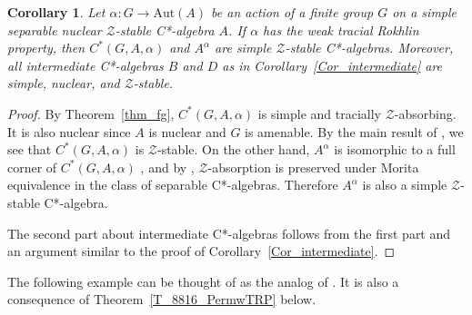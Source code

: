 \documentclass[11pt]{amsart}
\theoremstyle{plain}
\newtheorem{corollary}[theorem]{Corollary}
\theoremstyle{definition}
\theoremstyle{remark}
\numberwithin{equation}{section}
\begin{document}
\begin{corollary}\label{cor_fg_zs}
Let $\alpha \colon G \to \mathrm{Aut} (A)$ be an
action of a finite group $G$ on a
simple separable nuclear $\mathcal{Z}$-stable C*-algebra $A$.
If $\alpha$ has the weak tracial Rokhlin property,
then $C^{*} (G, A, \alpha)$ and $A^{\alpha}$ are
simple $\mathcal{Z}$-stable C*-algebras.
Moreover, all intermediate C*-algebras $B$ and $D$
as in Corollary~\ref{Cor_intermediate} are simple, nuclear, and
$\mathcal{Z}$-stable.
\end{corollary}

\begin{proof}
By Theorem~\ref{thm_fg},
  $C^{*} (G, A, \alpha)$ is  
simple and tracially $\mathcal{Z}$-absorbing. 
It is also nuclear since $A$ is nuclear and $G$ is amenable.
By the main result of \cite{CLS2021}, 
we see that $C^{*} (G, A, \alpha)$ is $\mathcal{Z}$-stable.
On the other hand,
$A^{\alpha}$ is isomorphic
to a full corner of $C^{*} (G, A, \alpha)$ \cite{Ro79},
and
by \cite[Corollary~3.2]{TW07},
$\mathcal{Z}$-absorption is preserved under Morita equivalence
in the class of separable C*-algebras.
Therefore $A^{\alpha}$ is also a
simple $\mathcal{Z}$-stable C*-algebra.

The second part about intermediate C*-algebras follows
from the first part and an argument similar to the proof
of Corollary~\ref{Cor_intermediate}.
\end{proof}

The following example can be thought of as
the analog of \cite[Example 5.10]{HO13}.
It is also a consequence of Theorem~\ref{T_8816_PermwTRP} below.
\end{document}
